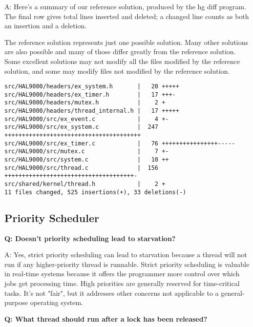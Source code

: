 A: Here’s a summary of our reference solution, produced by the hg  diff program. The final row gives
total lines inserted and deleted; a changed line counts as both an insertion and a deletion.

The reference solution represents just one possible solution. Many other solutions are also possible
and many of those differ greatly from the reference solution. Some excellent solutions may not
modify all the files modified by the reference solution, and some may modify files not modified by
the reference solution.

\begin{verbatim}
src/HAL9000/headers/ex_system.h       |   20 +++++
src/HAL9000/headers/ex_timer.h        |   17 +++-
src/HAL9000/headers/mutex.h           |    2 +
src/HAL9000/headers/thread_internal.h |   17 +++++
src/HAL9000/src/ex_event.c            |    4 +-
src/HAL9000/src/ex_system.c           |  247 +++++++++++++++++++++++++++++++++++++++
src/HAL9000/src/ex_timer.c            |   76 ++++++++++++++++-----
src/HAL9000/src/mutex.c               |    7 +-
src/HAL9000/src/system.c              |   10 ++
src/HAL9000/src/thread.c              |  156 +++++++++++++++++++++++++++++++++++++-
src/shared/kernel/thread.h            |    2 +
11 files changed, 525 insertions(+), 33 deletions(-)
\end{verbatim}

\newline

\subsection{Priority Scheduler}

\textbf{Q: Doesn’t priority scheduling lead to starvation?}

A: Yes, strict priority scheduling can lead to starvation because a thread will not run if any 
higher-priority thread is runnable. Strict priority scheduling is valuable in real-time systems 
because it offers the programmer more control over which jobs get processing time. High priorities
are generally reserved for time-critical tasks. It’s not "fair", but it addresses other concerns not
applicable to a general-purpose operating system.

\newline

\textbf{Q: What thread should run after a lock has been released?}

